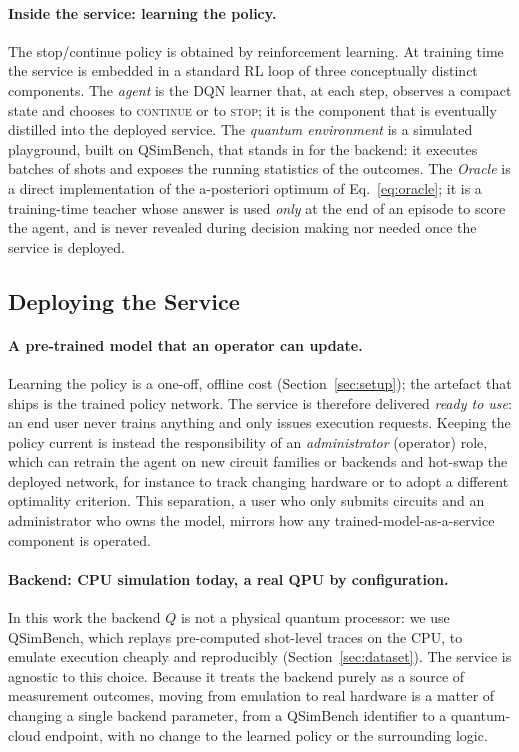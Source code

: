 \documentclass[runningheads]{llncs}
\begin{document}
\paragraph{Inside the service: learning the policy.} The stop/continue policy is
obtained by reinforcement learning. At training time the service is embedded in a
standard RL loop of three conceptually distinct components. The \emph{agent} is
the DQN learner that, at each step, observes a compact state and chooses to
\textsc{continue} or to \textsc{stop}; it is the component that is eventually
distilled into the deployed service. The \emph{quantum environment} is a
simulated playground, built on QSimBench, that stands in for the backend: it
executes batches of shots and exposes the running statistics of the outcomes. The
\emph{Oracle} is a direct implementation of the a-posteriori optimum of
Eq.~\eqref{eq:oracle}; it is a training-time teacher whose answer is used
\emph{only} at the end of an episode to score the agent, and is never revealed
during decision making nor needed once the service is deployed.

\subsection{Deploying the Service}
\label{sec:deploy}

\paragraph{A pre-trained model that an operator can update.} Learning the policy
is a one-off, offline cost (Section~\ref{sec:setup}); the artefact that ships is
the trained policy network. The service is therefore delivered \emph{ready to
use}: an end user never trains anything and only issues execution requests.
Keeping the policy current is instead the responsibility of an
\emph{administrator} (operator) role, which can retrain the agent on new circuit
families or backends and hot-swap the deployed network, for instance to track
changing hardware or to adopt a different optimality criterion. This separation,
a user who only submits circuits and an administrator who owns the model, mirrors
how any trained-model-as-a-service component is operated.

\paragraph{Backend: CPU simulation today, a real QPU by configuration.} In this
work the backend $Q$ is not a physical quantum processor: we use QSimBench, which
replays pre-computed shot-level traces on the CPU, to emulate execution cheaply
and reproducibly (Section~\ref{sec:dataset}). The service is agnostic to this
choice. Because it treats the backend purely as a source of measurement outcomes,
moving from emulation to real hardware is a matter of changing a single backend
parameter, from a QSimBench identifier to a quantum-cloud endpoint, with no change
to the learned policy or the surrounding logic.
\end{document}
